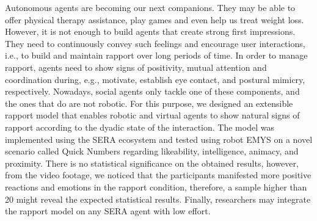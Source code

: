 \noindent Autonomous agents are becoming our next companions. They may be able to offer physical therapy assistance, play games and even help us treat weight loss. However, it is not enough to build agents that create strong first impressions. They need to continuously convey such feelings and encourage user interactions, i.e., to build and maintain rapport over long periods of time. In order to manage rapport, agents need to show signs of positivity, mutual attention and coordination during, e.g., motivate, establish eye contact, and postural mimicry, respectively. Nowadays, social agents only tackle one of these components, and the ones that do are not robotic. For this purpose, we designed an extensible rapport model that enables robotic and virtual agents to show natural signs of rapport according to the dyadic state of the interaction. The model was implemented using the \acf{SERA} ecosystem and tested using robot \ac{EMYS} on a novel scenario called Quick Numbers regarding likeability, intelligence, animacy, and proximity. There is no statistical significance on the obtained results, however, from the video footage, we noticed that the participants manifested more positive reactions and emotions in the rapport condition, therefore, a sample higher than 20 might reveal the expected statistical results. Finally, researchers may integrate the rapport model on any \ac{SERA} agent with low effort.




